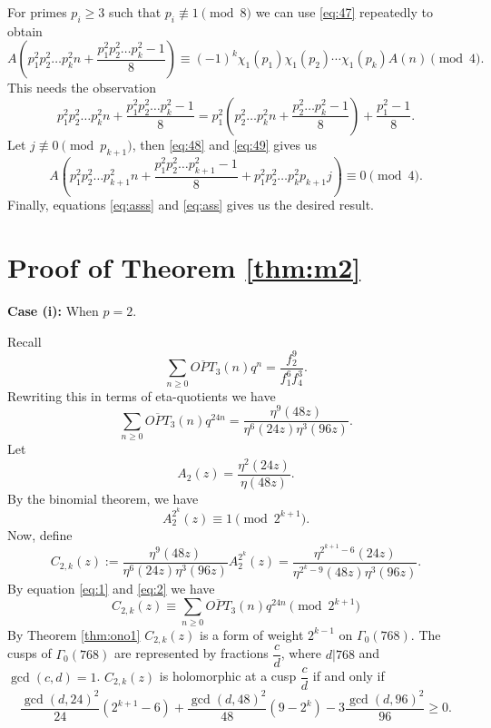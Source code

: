 \documentclass[12pt,reqno]{amsart}
\numberwithin{equation}{section}
\newcommand{\opt}{\overline{OPT}}
\begin{document}
    For primes $p_i\geq 3$ such that $p_i\not\equiv 1 \pmod 8$ we can use \eqref{eq:47} repeatedly to obtain
    \begin{equation}\label{eq:49}
           A\left(p_1^2p_2^2\ldots p_{k}^2n+\frac{p_1^2p_2^2\ldots p_{k}^2-1}{8}\right)\equiv (-1)^k\chi_1(p_1)\chi_1(p_2)\cdots\chi_1(p_{k})A(n) \pmod 4. 
    \end{equation}
This needs the observation
\[
p_1^2p_2^2\ldots p_k^2n+\frac{p_1^2p_2^2\ldots p_k^2-1}{8}=p_1^2\left(p_2^2\ldots p_k^2n+\frac{p_2^2\ldots p_k^2-1}{8}\right)+\frac{p_1^2-1}{8}.
\]
Let $j\not\equiv 0\pmod{p_{k+1}}$, then \eqref{eq:48} and \eqref{eq:49} gives us
\begin{equation}\label{eq:asss}
     A\left(p_1^2p_2^2\ldots p_{k+1}^2n+\frac{p_1^2p_2^2\ldots p_{k+1}^2-1}{8}+p_1^2p_2^2\ldots p_k^2p_{k+1}j\right)\equiv 0 \pmod 4. 
\end{equation}
Finally, equations \eqref{eq:asss} and \eqref{eq:ass} gives us the desired result.

\section{Proof of Theorem \ref{thm:m2}}\label{proof:density}
\textbf{Case (i):} When $p=2$.

Recall
\begin{equation}\label{eq:1}
    \sum_{n\geq 0}\opt_3(n)q^n=\frac{f_2^9}{f_1^6f_4^3}.
\end{equation}
Rewriting this in terms of eta-quotients we have
\begin{equation}\label{eq:2}
     \sum_{n\geq 0}\opt_3(n)q^{24n}=\frac{\eta^9(48z)}{\eta^6(24z)\eta^3(96z)}.
\end{equation}
Let
\[
A_2(z)=\frac{\eta^{2}(24z)}{\eta(48z)}.
\]
By the binomial theorem, we have
\[
A_2^{2^k}(z)\equiv 1 \pmod{2^{k+1}}.
\]
Now, define
\[
C_{2,k}(z):=\frac{\eta^9(48z)}{\eta^6(24z)\eta^3(96z)}A_2^{2^k}(z)=\frac{\eta^{2^{k+1}-6}(24z)}{\eta^{2^k-9}(48z)\eta^3(96z)}.
\]
By equation \eqref{eq:1} and \eqref{eq:2} we have
\begin{equation}\label{eq:a}
    C_{2,k}(z)\equiv \sum_{n\geq 0}\opt_3(n)q^{24n} \pmod{2^{k+1}}
\end{equation}
By Theorem \ref{thm:ono1} $C_{2,k}(z)$ is a form of weight $2^{k-1}$ on $\Gamma_0(768)$. The cusps of $\Gamma_0(768)$ are represented by fractions $\dfrac{c}{d}$, where $d|768$ and $\gcd(c,d)=1$. $C_{2,k}(z)$ is holomorphic at a cusp $\dfrac{c}{d}$ if and only if
\begin{equation}\label{eq:3}
    \frac{\gcd(d,24)^2}{24}(2^{k+1}-6)+    \frac{\gcd(d,48)^2}{48}(9-2^k)-    3\frac{\gcd(d,96)^2}{96}\geq 0.
\end{equation}
\end{document}

